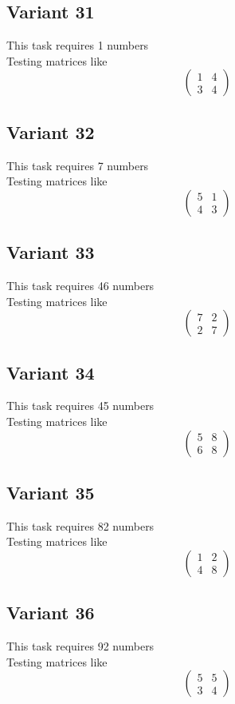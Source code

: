 \documentclass[11pt]{article}
\begin{document}
\subsection*{Variant 31}
This task requires 1 numbers\\
Testing matrices like \[ \begin{pmatrix} 1 & 4\\ 3 & 4 \end{pmatrix} \]

\subsection*{Variant 32}
This task requires 7 numbers\\
Testing matrices like \[ \begin{pmatrix} 5 & 1\\ 4 & 3 \end{pmatrix} \]

\subsection*{Variant 33}
This task requires 46 numbers\\
Testing matrices like \[ \begin{pmatrix} 7 & 2\\ 2 & 7 \end{pmatrix} \]

\subsection*{Variant 34}
This task requires 45 numbers\\
Testing matrices like \[ \begin{pmatrix} 5 & 8\\ 6 & 8 \end{pmatrix} \]

\subsection*{Variant 35}
This task requires 82 numbers\\
Testing matrices like \[ \begin{pmatrix} 1 & 2\\ 4 & 8 \end{pmatrix} \]

\subsection*{Variant 36}
This task requires 92 numbers\\
Testing matrices like \[ \begin{pmatrix} 5 & 5\\ 3 & 4 \end{pmatrix} \]
\end{document}
